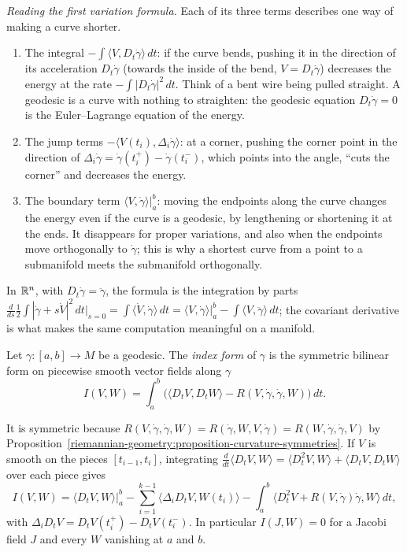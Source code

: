 \emph{Reading the first variation formula.} Each of its three terms describes one way of making a curve shorter.
\begin{enumerate}
\item The integral $-\int\langle V, D_t\dot\gamma\rangle\,dt$: if the curve bends, pushing it in the direction of its acceleration $D_t\dot\gamma$ (towards the inside of the bend, $V = D_t\dot\gamma$)
decreases the energy at the rate $-\int|D_t\dot\gamma|^2\,dt$. Think of a bent wire being pulled straight. A geodesic is a curve with nothing to straighten: the geodesic equation
$D_t\dot\gamma = 0$ is the Euler--Lagrange equation of the energy.
\item The jump terms $-\langle V(t_i), \Delta_i\dot\gamma\rangle$: at a corner, pushing the corner point in the direction of $\Delta_i\dot\gamma = \dot\gamma(t_i^+) - \dot\gamma(t_i^-)$, which
points into the angle, ``cuts the corner'' and decreases the energy.
\item The boundary term $\langle V, \dot\gamma\rangle|_a^b$: moving the endpoints along the curve changes the energy even if the curve is a geodesic, by lengthening or shortening it at the
ends. It disappears for proper variations, and also when the endpoints move orthogonally to $\dot\gamma$; this is why a shortest curve from a point to a submanifold meets the submanifold
orthogonally.
\end{enumerate}
In $\mathbb{R}^n$, with $D_t\dot\gamma = \ddot\gamma$, the formula is the integration by parts $\frac{d}{ds}\frac12\int|\dot\gamma + s\dot V|^2\,dt\big|_{s=0} = \int\langle\dot V, \dot\gamma\rangle\,dt =
\langle V, \dot\gamma\rangle|_a^b - \int\langle V, \ddot\gamma\rangle\,dt$; the covariant derivative is what makes the same computation meaningful on a manifold.

\begin{definition}\label{riemannian-geometry:definition-index-form}
Let $\gamma \colon [a, b] \to M$ be a geodesic. The \emph{index form} of $\gamma$ is the symmetric bilinear form on piecewise smooth vector fields along $\gamma$
\[
I(V, W) = \int_a^b\bigl(\langle D_tV, D_tW\rangle - R(V, \dot\gamma, \dot\gamma, W)\bigr)\,dt .
\]
\end{definition}

It is symmetric because $R(V, \dot\gamma, \dot\gamma, W) = R(\dot\gamma, W, V, \dot\gamma) = R(W, \dot\gamma, \dot\gamma, V)$ by
Proposition~\ref{riemannian-geometry:proposition-curvature-symmetries}. If $V$ is smooth on the pieces $[t_{i-1}, t_i]$, integrating
$\frac{d}{dt}\langle D_tV, W\rangle = \langle D_t^2V, W\rangle + \langle D_tV, D_tW\rangle$ over each piece gives
\begin{equation}\label{riemannian-geometry:equation-index-form-parts}
I(V, W) = \langle D_tV, W\rangle\Big|_a^b - \sum_{i=1}^{k-1}\langle\Delta_iD_tV, W(t_i)\rangle - \int_a^b\langle D_t^2V + R(V, \dot\gamma)\dot\gamma, W\rangle\,dt,
\end{equation}
with $\Delta_iD_tV = D_tV(t_i^+) - D_tV(t_i^-)$. In particular $I(J, W) = 0$ for a Jacobi field $J$ and every $W$ vanishing at $a$ and $b$.

